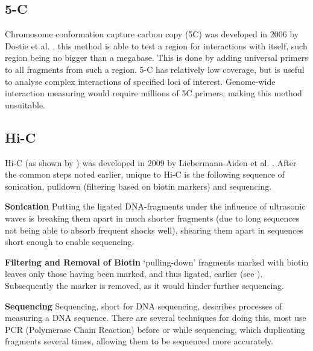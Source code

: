 \subsection{5-C}\label{sec:5C}

Chromosome conformation capture carbon copy (5C) was developed in 2006 by
Dostie et al. \cite{dostie2006chromosome}, this method is able to test a region
for interactions with itself, such region being no bigger than a megabase. This
is done by adding universal primers to all fragments from such a region.
5-C has relatively low coverage, but is useful to analyse complex interactions
of specified loci of interest. Genome-wide interaction measuring would require
millions of 5C primers, making this method unsuitable.







\subsection{Hi-C}\label{sec:HiC}

Hi-C (as shown by ) was developed in 2009 by Liebermann-Aiden et al.
\cite{lieberman2009comprehensive}. After the common steps noted earlier, unique
to Hi-C is the following sequence of sonication, pulldown (filtering based on
biotin markers) and sequencing.


\textbf{Sonication}\label{sec:sonication}
Putting the ligated DNA-fragments under the influence of ultrasonic waves is
breaking them apart in much shorter fragments (due to long sequences not being
able to absorb frequent shocks well), shearing them apart in sequences short
enough to enable sequencing.


\textbf{Filtering and Removal of Biotin}\label{sec:pulldown}
`pulling-down' fragments marked with biotin leaves only those having been
marked, and thus ligated, earlier (see ). Subsequently the
marker is removed, as it would hinder further sequencing.


\textbf{Sequencing}\label{sec:sequencing}
Sequencing, short for DNA sequencing, describes processes of measuring a DNA
sequence. There are several techniques for doing this, most use PCR (Polymerase
Chain Reaction) before or while sequencing, which duplicating fragments
several times, allowing them to be sequenced more accurately.



